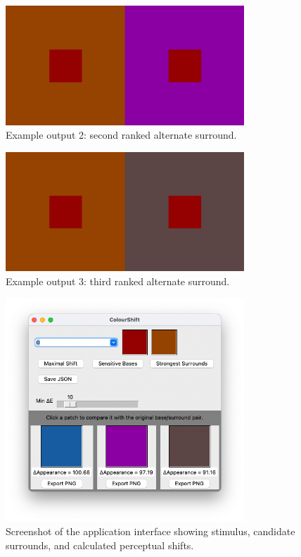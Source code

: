 \documentclass[11pt]{article}
\begin{document}
\begin{figure}[h!]
\centering
\includegraphics[width=0.8\textwidth]{2.png}
\caption{Example output 2: second ranked alternate surround.}
\end{figure}

\begin{figure}[h!]
\centering
\includegraphics[width=0.8\textwidth]{3.png}
\caption{Example output 3: third ranked alternate surround.}
\end{figure}

\begin{figure}[h!]
\centering
\includegraphics[width=0.8\textwidth]{screenshot.png}
\caption{Screenshot of the application interface showing stimulus, candidate surrounds, and calculated perceptual shifts.}
\end{figure}
\end{document}
